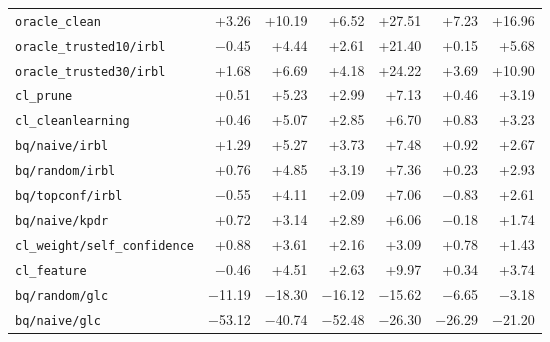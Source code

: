 \begin{tabular}{lrrrrrr}
\addlinespace
\texttt{oracle\_clean} & +3.26 & +10.19 & +6.52 & +27.51 & +7.23 & +16.96 \\
\texttt{oracle\_trusted10/irbl} & $-$0.45 & +4.44 & +2.61 & +21.40 & +0.15 & +5.68 \\
\texttt{oracle\_trusted30/irbl} & +1.68 & +6.69 & +4.18 & +24.22 & +3.69 & +10.90 \\
\texttt{cl\_prune} & +0.51 & +5.23 & +2.99 & +7.13 & +0.46 & +3.19 \\
\texttt{cl\_cleanlearning} & +0.46 & +5.07 & +2.85 & +6.70 & +0.83 & +3.23 \\
\texttt{bq/naive/irbl} & +1.29 & +5.27 & +3.73 & +7.48 & +0.92 & +2.67 \\
\texttt{bq/random/irbl} & +0.76 & +4.85 & +3.19 & +7.36 & +0.23 & +2.93 \\
\texttt{bq/topconf/irbl} & $-$0.55 & +4.11 & +2.09 & +7.06 & $-$0.83 & +2.61 \\
\texttt{bq/naive/kpdr} & +0.72 & +3.14 & +2.89 & +6.06 & $-$0.18 & +1.74 \\
\texttt{cl\_weight/self\_confidence} & +0.88 & +3.61 & +2.16 & +3.09 & +0.78 & +1.43 \\
\texttt{cl\_feature} & $-$0.46 & +4.51 & +2.63 & +9.97 & +0.34 & +3.74 \\
\texttt{bq/random/glc} & $-$11.19 & $-$18.30 & $-$16.12 & $-$15.62 & $-$6.65 & $-$3.18 \\
\texttt{bq/naive/glc} & $-$53.12 & $-$40.74 & $-$52.48 & $-$26.30 & $-$26.29 & $-$21.20 \\
\bottomrule
\end{tabular}
